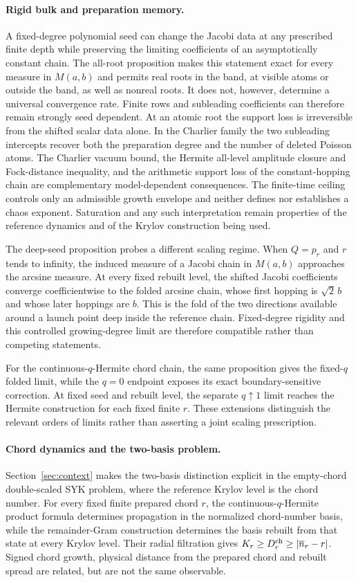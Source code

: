 \documentclass[a4paper,11pt]{article}
\theoremstyle{definition}
\theoremstyle{remark}
\begin{document}
\paragraph{Rigid bulk and preparation memory.}
A fixed-degree polynomial seed can change the Jacobi data at any prescribed finite depth while preserving the limiting coefficients of an asymptotically constant chain. The all-root proposition makes this statement exact for every measure in $M(a,b)$ and permits real roots in the band,
at visible atoms or outside the band, as well as nonreal roots.  It does not, however, determine a
universal convergence rate.  Finite
rows and subleading coefficients can therefore remain strongly seed dependent.  At an atomic root
the support loss is irreversible from the shifted scalar data alone.  In the Charlier family the
two subleading intercepts recover both the preparation degree and the number of deleted Poisson
atoms.  The Charlier
vacuum bound, the Hermite all-level amplitude closure and Fock-distance inequality, and the arithmetic support loss of the
constant-hopping chain are complementary model-dependent consequences.  The finite-time
ceiling controls only an admissible growth envelope and neither defines nor establishes a chaos exponent. Saturation and any such interpretation remain
properties of the reference dynamics and of the Krylov construction being used.

The deep-seed proposition probes a different scaling regime.  When $Q=p_r$ and $r$ tends to infinity,
the induced measure of a Jacobi chain in $M(a,b)$ approaches the arcsine measure. At every fixed rebuilt level, the shifted
Jacobi coefficients converge coefficientwise to the folded arcsine chain, whose first hopping is
$\sqrt2\,b$ and whose later hoppings are $b$.  This is the fold of the two directions
available around a launch point deep inside the reference chain.  Fixed-degree rigidity and this
controlled growing-degree limit are therefore compatible rather than competing statements. 

For the continuous-$q$-Hermite chord chain, the same proposition gives the fixed-$q$ folded
limit, while the $q=0$ endpoint exposes its exact boundary-sensitive correction.  At fixed seed
and rebuilt level, the separate $q\uparrow1$ limit reaches the Hermite construction for each fixed
finite $r$.
These extensions distinguish the relevant orders of limits rather than asserting a joint scaling
prescription.

\paragraph{Chord dynamics and the two-basis problem.}
Section~\ref{sec:context} makes the two-basis distinction explicit in the empty-chord
double-scaled SYK problem, where the reference Krylov level is the chord number.  For every fixed
finite prepared chord $r$, the continuous-$q$-Hermite product formula determines propagation in
the normalized chord-number basis, while the remainder-Gram construction determines the basis rebuilt
from that state at every Krylov level.  Their radial filtration gives
$K_r\ge D_r^{\rm ch}\ge|\overline n_r-r|$. 
Signed chord growth, physical distance from the prepared chord and rebuilt
spread are related, but are not the same observable.
\end{document}
